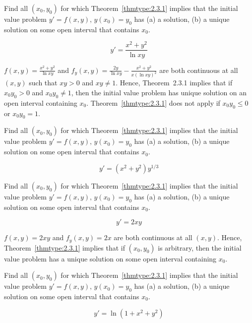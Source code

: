 \documentclass{ximera}
\begin{document}
\begin{problem}\label{exer:2.3.4} Find all $(x_0,y_0)$ for
which Theorem~\ref{thmtype:2.3.1}
implies that the initial value problem $y'=f(x,y),\,  y(x_0)=y_0$ has
(a) a solution, (b) a  unique solution on some open interval that contains $x_0$.

$$y'=\frac{x^2+y^2}{\ln xy}$$ 



\begin{solution}
    $f(x,y)=\frac{x^2+y^2}{\ln xy}$ and $f_y(x,y)=\frac{2y}{\ln
xy}-\frac{x^2+y^2}{ x(\ln xy)^2}$ are both continuous at all $(x,y)$
such that $xy>0$ and $xy\ne1$. Hence,  Theorem~2.3.1 implies
that if
$x_0y_0>0$ and $x_0y_0\ne1$, then the
initial value problem has unique solution on an open interval
containing $x_0$.   Theorem~\ref{thmtype:2.3.1} does not apply
if $x_0y_0\le0$ or $x_0y_0=1$.
\end{solution}
\end{problem}

\begin{problem}\label{exer:2.3.5} Find all $(x_0,y_0)$ for
which Theorem~\ref{thmtype:2.3.1}
implies that the initial value problem $y'=f(x,y),\,  y(x_0)=y_0$ has
(a) a solution, (b) a  unique solution on some open interval that contains $x_0$.

$$y'=(x^2+y^2)y^{1/3}$$ 
\end{problem}

\begin{problem}\label{exer:2.3.6} Find all $(x_0,y_0)$ for
which Theorem~\ref{thmtype:2.3.1}
implies that the initial value problem $y'=f(x,y),\,  y(x_0)=y_0$ has
(a) a solution, (b) a  unique solution on some open interval that contains $x_0$.

$$y'=2xy$$ 



\begin{solution}
    $f(x,y)=2xy$ and $f_y(x,y)=2x$ are both continuous at all $(x,y)$.
Hence,  Theorem~\ref{thmtype:2.3.1} implies that if $(x_0,y_0)$
is arbitrary, then the initial value problem
has a  unique solution on some open interval containing  $x_0$.
\end{solution}
\end{problem}

\begin{problem}\label{exer:2.3.7} Find all $(x_0,y_0)$ for
which Theorem~\ref{thmtype:2.3.1}
implies that the initial value problem $y'=f(x,y),\,  y(x_0)=y_0$ has
(a) a solution, (b) a  unique solution on some open interval that contains $x_0$.

$$y'=\ln(1+x^2+y^2)$$
\end{problem}
\end{document}
